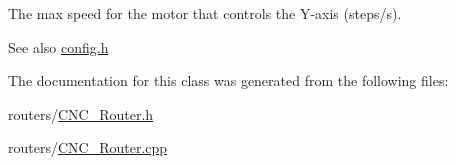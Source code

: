 The max speed for the motor that controls the Y-\/axis (steps/s). 

\begin{DoxySeeAlso}{See also}
\hyperlink{config_8h}{config.\+h} 
\end{DoxySeeAlso}


The documentation for this class was generated from the following files\+:\begin{DoxyCompactItemize}
\item 
routers/\hyperlink{_c_n_c___router_8h}{C\+N\+C\+\_\+\+Router.\+h}\item 
routers/\hyperlink{_c_n_c___router_8cpp}{C\+N\+C\+\_\+\+Router.\+cpp}\end{DoxyCompactItemize}

